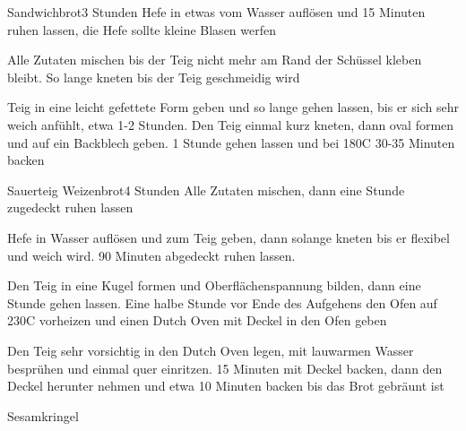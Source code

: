 \begin{recipe}{Sandwichbrot}{}{3 Stunden}
Hefe in etwas vom Wasser auflösen und 15 Minuten ruhen lassen, die Hefe sollte kleine Blasen werfen

Alle Zutaten mischen bis der Teig nicht mehr am Rand der Schüssel kleben bleibt. So lange kneten bis der Teig geschmeidig wird

\ing[]{}{}
Teig in eine leicht gefettete Form geben und so lange gehen lassen, bis er sich sehr weich anfühlt, etwa 1-2 Stunden. Den Teig einmal kurz kneten, dann oval formen und auf ein Backblech geben.
1 Stunde gehen lassen und bei 180\0C 30-35 Minuten backen
\end{recipe}


\begin{recipe}{Sauerteig Weizenbrot}{}{4 Stunden}
Alle Zutaten mischen, dann eine Stunde zugedeckt ruhen lassen

Hefe in Wasser auflösen und zum Teig geben, dann solange kneten bis er flexibel und weich wird.
90 Minuten abgedeckt ruhen lassen.

\ing[]{}{}
Den Teig in eine Kugel formen und Oberflächenspannung bilden, dann eine Stunde gehen lassen.
Eine halbe Stunde vor Ende des Aufgehens den Ofen auf 230\0C vorheizen und einen Dutch Oven mit Deckel in den Ofen geben

\ing[]{}{}
Den Teig sehr vorsichtig in den Dutch Oven legen, mit lauwarmen Wasser besprühen und einmal quer einritzen. 15 Minuten mit Deckel backen, dann den Deckel herunter nehmen und etwa 10 Minuten backen bis das Brot gebräunt ist
\end{recipe}


\begin{recipe}{Sesamkringel}{}{}

\end{recipe}


